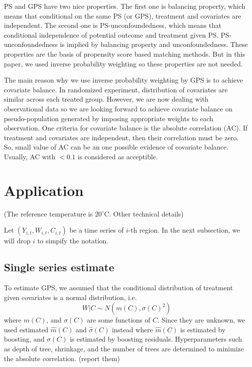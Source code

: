 \documentclass[12pt]{article}
\begin{document}
PS and GPS have two nice properties.\cite{rosenbaum1983, hirano2004}
The first one is balancing property, which means that conditional on the same PS (or GPS),
treatment and covariates are independent.
The second one is PS-unconfoundedness, 
which means that conditional independence of potential outcome and treatment given PS.
PS-unconfoundedness is implied by balancing property and unconfoundedness.
These properties are the basis of propensity score based matching methods.
But in this paper, we used inverse probability weighting so these properties are not needed.

The main reason why we use inverse probability weighting by GPS is to achieve covariate balance.
In randomized experiment, distribution of covariates are similar across each treated group.
However, we are now dealing with observational data 
so we are looking forward to achieve covariate balance on pseudo-population generated by
imposing appropriate weights to each observation.
One criteria for covariate balance is the absolute correlation (AC).\cite{gpsboosting2015}
If treatment and covariates are independent, then their correlation must be zero.
So, small value of AC can be an one possible evidence of covariate balance.
Usually, AC with $ <0.1 $ is considered as acceptible.


\section{Application}
(The reference temperature is $20^\circ$C.
Other technical details)

Let $(Y_{i,t}, W_{i,t}, C_{i,t})$ be a time series of $i$-th region.
In the next subsection, we will drop $i$ to simpify the notation.

\subsection{Single series estimate}

To estimate GPS, we assumed that the conditional distribution of treatment given covariates is
a normal distribution, i.e.
\[ 
	W\lvert C \sim N(m(C), \sigma(C)^2) 
\] 
where $m(C)$, and $\sigma(C)$ are some functions of $C$.
Since they are unknown, we used estimated $\hat{m}(C)$ and $\hat{\sigma}(C)$ instead
where $\hat{m}(C)$ is estimated by boosting, 
and $\hat{\sigma}(C)$ is estimated by boosting residuals.\cite{hirano2004, gpsboosting2015}
Hyperparameters such as depth of tree, shrinkage, and the number of trees are determined
to minimize the absolute correlation. (report them)
\end{document}
